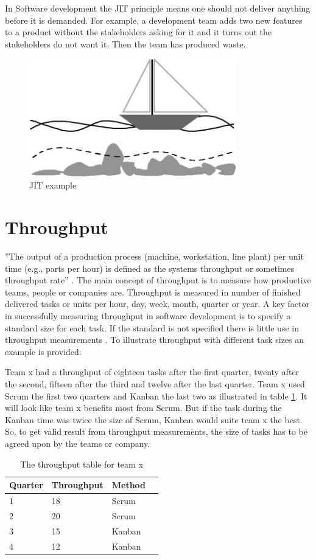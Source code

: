 \documentclass[UKenglish]{ifimaster}  %
\begin{document}
In Software development the JIT principle means one should not deliver anything before it is demanded. For example, a development team adds two new features to a product without the stakeholders asking for it and it turns out the stakeholders do not want it. Then the team has produced waste. 
\begin{figure}[ht!]
\centering
\includegraphics[width=90mm]{Picture/JIT.jpg}
\caption{JIT example}
\label{JITE} %
\end{figure}

\section{Throughput}
''The output of a production process (machine, workstation, line plant) per unit time (e.g., parts per hour) is defined as the systems throughput or sometimes throughput rate'' \parencite{Adams}.
The main concept of throughput is to measure how productive teams, people or companies are. Throughput is measured in number of finished delivered tasks or units per hour, day, week, month, quarter or year. A key factor in successfully measuring throughput in software development is to specify a standard size for each task. If the standard is not specified there is little use in throughput measurements \parencite{Throughput}. To illustrate throughput with different task sizes an example is provided:  

Team x had a throughput of eighteen tasks after the first quarter, twenty after the second, fifteen after the third and twelve after the last quarter. Team x used Scrum the first two quarters and Kanban the last two as illustrated in table \ref{tt}. It will look like team x benefits most from Scrum. But if the task during the Kanban time was twice the size of Scrum, Kanban would suite team x the best. So, to get valid result from throughput measurements, the size of tasks has to be agreed upon by the teams or company.
\begin{table}[ht]
\begin{center}
\caption{The throughput table for team x}
    \begin{tabular}{| l | l | l | l |}
    \hline
    Quarter & Throughput & Method\\ \hline
    1 & 18 & Scrum\\ \hline
    2 & 20 & Scrum \\ \hline
    3 & 15 & Kanban\\ \hline
    4 & 12 & Kanban\\ \hline
    \end{tabular}
\label{tt} %
\end{center}
\end{table}
\end{document}
